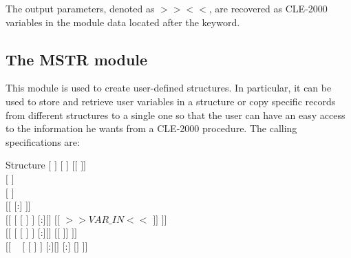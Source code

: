 The output parameters, denoted as $>>$$<<$, are recovered as CLE-2000 variables in the
module data located after the \moc{::} keyword.

\clearpage

\subsection{The MSTR module}\label{sect:MSTRData}

This module is used to create user-defined structures. In particular, it can be used to store and
retrieve user variables in a structure or copy specific records from different structures to a single
one so that the user can have an easy access to the information he wants from a CLE-2000 procedure.
The calling specifications are:

\begin{DataStructure}{Structure }
$[$  \moc{:=} $]$  $[$  $]$ $[[$  $]]$ \moc{::} \\
$[$   $]$ \\
$[$    $]$ \\
$[[$  $[$:$]$ $]]$ \\
$[[$   $[$  $[$  $]$ $]$ $[$:$]$$[$$]$ $[[$ $>>VAR\_IN<<$ $]]$ $]]$ \\
$[[$   $[$  $[$  $]$ $]$ $[$:$]$$[$$]$ $[[$  $]]$ $]]$ \\
$[[$ ~  $[$  $[$  $]$ $]$ $[$:$]$$[$$]$ $[$:$]$  $[$$]$ $]]$ \\
\moc{;}
\end{DataStructure}

